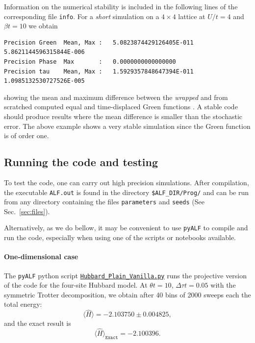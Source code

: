 Information on the numerical stability is included in the following lines of the corresponding file \texttt{info}. 
For a  \textit{short} simulation on a $4 \times 4$  lattice at $U/t=4$ and $\beta t = 10$  we obtain
\begin{lstlisting}[basicstyle=\ttfamily\small,columns=fullflexible,keepspaces=true]
Precision Green  Mean, Max :   5.0823874429126405E-011  5.8621144596315844E-006
Precision Phase  Max       :   0.0000000000000000    
Precision tau    Mean, Max :   1.5929357848647394E-011  1.0985132530727526E-005 
\end{lstlisting}
showing the mean and maximum difference between the \textit{wrapped}  and from scratched computed equal and time-displaced  Green functions \cite{Assaad08_rev}.
A stable code  should produce results where the mean difference is smaller than the  stochastic error. The above example  shows a very stable simulation since the Green function  is of order one. 

\subsection{Running the code and testing}

To test the code, one can carry out high precision simulations. After compilation, the executable \texttt{ALF.out} is found in the directory \texttt{\$ALF\_DIR/Prog/} and can be run from any directory containing the files \texttt{parameters} and \texttt{seeds} (See Sec.~\ref{sec:files}).

Alternatively, as we do bellow, it may be convenient to use \texttt{pyALF} to compile and run the code, especially when using one of the scripts or notebooks available.  

\paragraph*{One-dimensional case} 

The \texttt{pyALF} python script   \href{https://github.com/ALF-QMC/pyALF/blob/\pyALFbranch/Scripts/Hubbard_Plain_Vanilla.py}{\texttt{Hubbard\_Plain\_Vanilla.py}}   runs the projective version of the code for the four-site Hubbard model.  At $\theta t =10$, $\Delta \tau t = 0.05 $ with the symmetric Trotter  decomposition, we obtain after 40 bins of 2000 sweeps each the total energy:   
\begin{equation*}
       \langle  \hat{H}   \rangle = -2.103750  \pm      0.004825,
 \end{equation*}
and the exact result is  
\begin{equation*}
\langle  \hat{H}   \rangle_{\texttt{Exact}}    = -2.100396.
\end{equation*}

